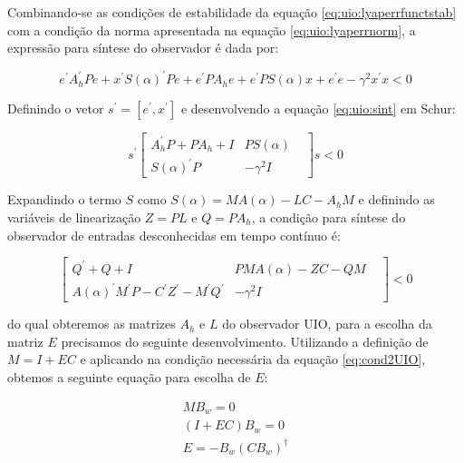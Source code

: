 Combinando-se as condições de estabilidade da equação \eqref{eq:uio:lyaperrfunctstab} com a condição da norma apresentada na equação \eqref{eq:uio:lyaperrnorm}, a expressão para síntese do observador é dada por:

\begin{equation}\label{eq:uio:sint}
  e^'A^'_hPe+x^'S(\alpha)^'Pe+e^'PA_he+e^'PS(\alpha)x+e^'e-\gamma^2x^'x<0 
\end{equation}

Definindo o vetor $s^'=[e^',x^']$ e desenvolvendo a equação \eqref{eq:uio:sint} em Schur:

\begin{equation}\label{eq:uio:sintschur}
  s^'
  \begin{bmatrix}
    A^'_hP+PA_h+I& PS(\alpha)&\\ 
    S(\alpha)^'P& -\gamma^2I
  \end{bmatrix}
  s<0
\end{equation}

Expandindo o termo $S$ como $S(\alpha)=MA(\alpha)-LC-A_hM$ e definindo as variáveis de linearização $Z=PL$ e $Q=PA_h$, a condição para síntese do observador de entradas desconhecidas em tempo contínuo é:

\begin{equation}\label{eq:uio:sintfinal}  
  \begin{bmatrix}
    Q^'+Q+I& PMA(\alpha)-ZC-QM&\\ 
    A(\alpha)^'M^'P-C^'Z^'-M^'Q^'& -\gamma^2I
  \end{bmatrix} <0
\end{equation}

do qual obteremos as matrizes $A_h$ e $L$ do observador UIO, para a escolha da matriz $E$ precisamos do seguinte desenvolvimento. Utilizando a definição de $M=I+EC$ e aplicando na condição necessária da equação \eqref{eq:cond2UIO}, obtemos a seguinte equação para escolha de $E$:

\begin{equation}
  \begin{split}
    MB_w=0\\
    (I+EC)B_w=0\\
    E=-B_w(CB_w)^{\dagger}
  \end{split}
\end{equation}


